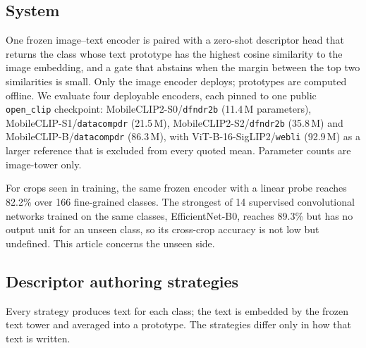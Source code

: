 \documentclass[a4paper,fleqn]{cas-dc}
\begin{document}
\subsection{System}
\label{sec:system}

One frozen image--text encoder is paired with a zero-shot descriptor head that returns the class
whose text prototype has the highest cosine similarity to the image embedding, and a gate that
abstains when the margin between the top two similarities is small. Only the image encoder deploys;
prototypes are computed offline. We evaluate four deployable encoders, each pinned to one public
\texttt{open\_clip} checkpoint: MobileCLIP2-S0/\texttt{dfndr2b} (11.4\,M parameters),
MobileCLIP-S1/\texttt{datacompdr} (21.5\,M), MobileCLIP2-S2/\texttt{dfndr2b} (35.8\,M) and
MobileCLIP-B/\texttt{datacompdr} (86.3\,M), with ViT-B-16-SigLIP2/\texttt{webli} (92.9\,M) as a
larger reference that is excluded from every quoted mean. Parameter counts are image-tower only.

For crops seen in training, the same frozen encoder with a linear probe reaches 82.2\% over 166
fine-grained classes. The strongest of 14 supervised convolutional networks trained on the same
classes, EfficientNet-B0, reaches 89.3\% but has no output unit for an unseen class, so its
cross-crop accuracy is not low but undefined.
This article concerns the unseen side.

\subsection{Descriptor authoring strategies}
\label{sec:strategies}

Every strategy produces text for each class; the text is embedded by the frozen text tower and
averaged into a prototype. The strategies differ only in how that text is written.
\end{document}

